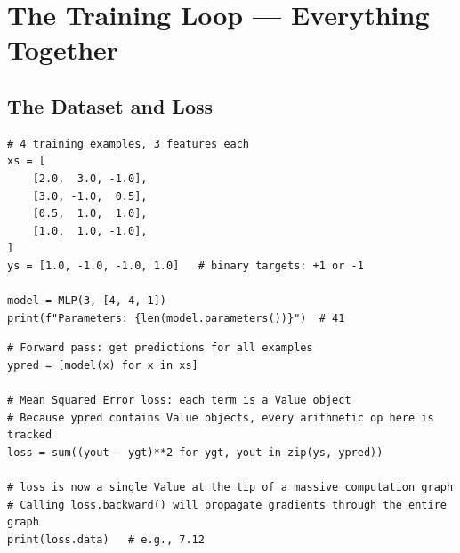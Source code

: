 \documentclass[12pt,a4paper]{article}
\begin{document}
\begin{center}
\end{center}

\section{The Training Loop — Everything Together}

\subsection{The Dataset and Loss}

\begin{lstlisting}
# 4 training examples, 3 features each
xs = [
    [2.0,  3.0, -1.0],
    [3.0, -1.0,  0.5],
    [0.5,  1.0,  1.0],
    [1.0,  1.0, -1.0],
]
ys = [1.0, -1.0, -1.0, 1.0]   # binary targets: +1 or -1

model = MLP(3, [4, 4, 1])
print(f"Parameters: {len(model.parameters())}")  # 41
\end{lstlisting}

\begin{lstlisting}
# Forward pass: get predictions for all examples
ypred = [model(x) for x in xs]

# Mean Squared Error loss: each term is a Value object
# Because ypred contains Value objects, every arithmetic op here is tracked
loss = sum((yout - ygt)**2 for ygt, yout in zip(ys, ypred))

# loss is now a single Value at the tip of a massive computation graph
# Calling loss.backward() will propagate gradients through the entire graph
print(loss.data)   # e.g., 7.12
\end{lstlisting}
\end{document}
